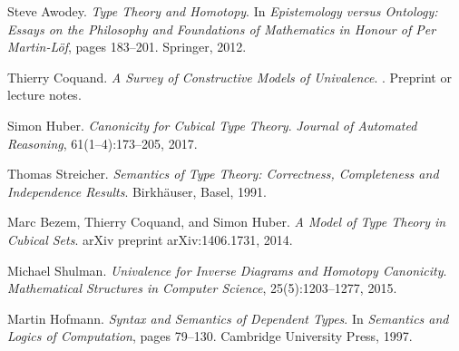 \documentclass{article}
\begin{document}
\begin{thebibliography}{99}
Steve Awodey.
\newblock \emph{Type Theory and Homotopy}.
\newblock In \emph{Epistemology versus Ontology: Essays on the Philosophy and Foundations of Mathematics in Honour of Per Martin-Löf}, pages 183--201. Springer, 2012.

Thierry Coquand.
\newblock \emph{A Survey of Constructive Models of Univalence}.
. Preprint or lecture notes.

Simon Huber.
\newblock \emph{Canonicity for Cubical Type Theory}.
\newblock \emph{Journal of Automated Reasoning}, 61(1--4):173--205, 2017.

Thomas Streicher.
\newblock \emph{Semantics of Type Theory: Correctness, Completeness and Independence Results}.
\newblock Birkhäuser, Basel, 1991.

Marc Bezem, Thierry Coquand, and Simon Huber.
\newblock \emph{A Model of Type Theory in Cubical Sets}.
\newblock arXiv preprint arXiv:1406.1731, 2014.

Michael Shulman.
\newblock \emph{Univalence for Inverse Diagrams and Homotopy Canonicity}.
\newblock \emph{Mathematical Structures in Computer Science}, 25(5):1203--1277, 2015.

Martin Hofmann.
\newblock \emph{Syntax and Semantics of Dependent Types}.
\newblock In \emph{Semantics and Logics of Computation}, pages 79--130. Cambridge University Press, 1997.

\end{thebibliography}
\end{document}

